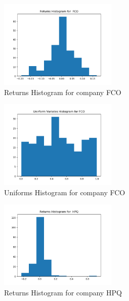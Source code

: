\documentclass[a4paper,12pt]{article}
\begin{document}
\begin{figure}[h]

\centering
\includegraphics[width=0.5\textwidth]{fco_returns_histogram}
\caption{Returns Histogram for company FCO}
\label{image-fco_hist}

\end{figure} 

\begin{figure}[h]

\centering
\includegraphics[width=0.5\textwidth]{fco_uniforms_histogram}
\caption{Uniforms Histogram for company FCO}
\label{image-fco_hist1}

\end{figure} 

\begin{figure}[h]

\centering
\includegraphics[width=0.5\textwidth]{hpq_returns_histogram}
\caption{Returns Histogram for company HPQ}
\label{image-hpq_hist}

\end{figure} 
\end{document}

